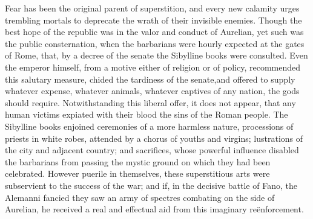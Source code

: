 



Fear has been the original parent of superstition, and every new
calamity urges trembling mortals to deprecate the wrath of their
invisible enemies. Though the best hope of the republic was in
the valor and conduct of Aurelian, yet such was the public
consternation, when the barbarians were hourly expected at the
gates of Rome, that, by a decree of the senate the Sibylline
books were consulted. Even the emperor himself, from a motive
either of religion or of policy, recommended this salutary
measure, chided the tardiness of the senate,\footnotemark[38] and offered to
supply whatever expense, whatever animals, whatever captives of
any nation, the gods should require. Notwithstanding this liberal
offer, it does not appear, that any human victims expiated with
their blood the sins of the Roman people. The Sibylline books
enjoined ceremonies of a more harmless nature, processions of
priests in white robes, attended by a chorus of youths and
virgins; lustrations of the city and adjacent country; and
sacrifices, whose powerful influence disabled the barbarians from
passing the mystic ground on which they had been celebrated.
However puerile in themselves, these superstitious arts were
subservient to the success of the war; and if, in the decisive
battle of Fano, the Alemanni fancied they saw an army of spectres
combating on the side of Aurelian, he received a real and
effectual aid from this imaginary reënforcement.\footnotemark[39]



